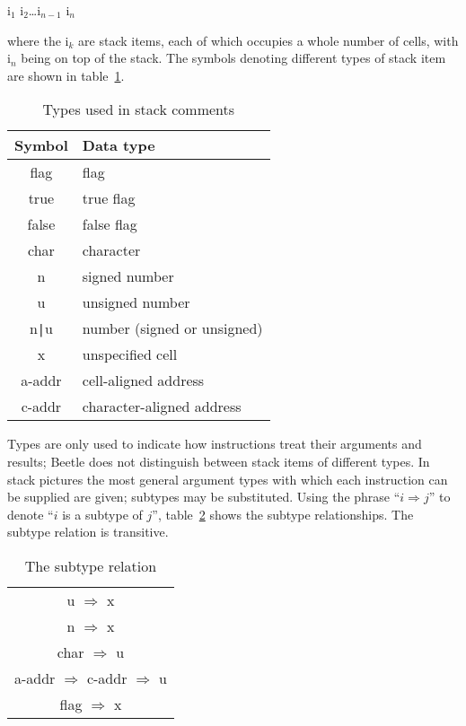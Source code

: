 \documentclass{article}
\newcommand{\spic}[1]{{\spfont\setlength{\baselineskip}{\normalbaselineskip}#1\/}}
\begin{document}
\centerline{\spic{i$_1$ i$_2$\dots i$_{n-1}$ i$_n$}}

where the \spic{i$_k$} are stack items, each of which occupies a whole number of
cells, with \spic{i$_n$} being on top of the stack. The symbols denoting
different types of stack item are shown in table~\ref{typetable}.

\begin{table}[htbp]
\begin{center}
\begin{tabular}{cl} \toprule
\bf Symbol & \bf Data type \\ \midrule
\spic{flag} & flag \\
\spic{true} & true flag \\
\spic{false} & false flag \\
\spic{char} & character \\
\spic{n} & signed number \\
\spic{u} & unsigned number \\
\spic{n{\tt |}u} & number (signed or unsigned) \\
\spic{x} & unspecified cell \\
\spic{a-addr} & cell-aligned address \\
\spic{c-addr} & character-aligned address \\ \bottomrule
\end{tabular}
\caption{\label{typetable}Types used in stack comments}
\end{center}
\end{table}

Types are only used to indicate how instructions treat their arguments and
results; Beetle does not distinguish between stack items of different types. In
stack pictures the most general argument types with which each instruction can
be supplied are given; subtypes may be substituted. Using the phrase ``$i
\Rightarrow j$'' to denote ``$i$\/ is a subtype of $j$\/'', table~\ref{reltable}
shows the subtype relationships. The subtype relation is transitive.

\begin{table}[htbp]
\begin{center}
\begin{tabular}{c} \toprule
\spic{u} $\Rightarrow$ \spic{x} \\
\spic{n} $\Rightarrow$ \spic{x} \\
\spic{char} $\Rightarrow$ \spic{u} \\
\spic{a-addr} $\Rightarrow$ \spic{c-addr} $\Rightarrow$ \spic{u} \\
\spic{flag} $\Rightarrow$ \spic{x} \\ \bottomrule
\end{tabular}
\caption{\label{reltable}The subtype relation}
\end{center}
\end{table}
\end{document}
